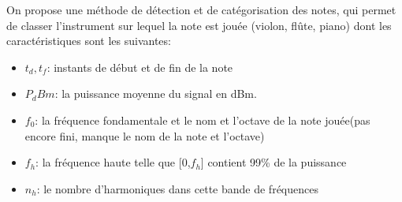 On propose une méthode de détection et de catégorisation des notes, qui permet de classer l'instrument sur lequel la note est jouée (violon, flûte, piano) dont les caractéristiques sont les suivantes: 
\begin{itemize}
  \item $t_d,t_f$: instants de début et de fin de la note
  \item $P_dBm$: la puissance moyenne du signal en dBm.
  \item $f_0$: la fréquence fondamentale et le nom et l'octave de la note jouée(pas encore fini, manque le nom de la note et l'octave)
  \item $f_h$: la fréquence haute telle que [0,$f_h$] contient 99\% de la puissance
  \item $n_h$: le nombre d'harmoniques dans cette bande de fréquences
\end{itemize}
